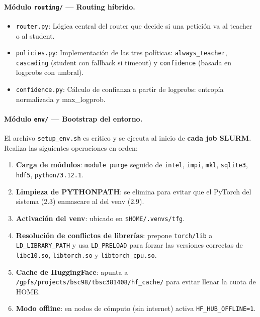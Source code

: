 \documentclass[11pt,a4paper]{article}
\begin{document}
\paragraph{M\'odulo \texttt{routing/} --- Routing h\'ibrido.}
\begin{itemize}[leftmargin=2em]
  \item \texttt{router.py}: L\'ogica central del router que decide
    si una petici\'on va al teacher o al student.
  \item \texttt{policies.py}: Implementaci\'on de las tres pol\'iticas:
    \texttt{always\_teacher}, \texttt{cascading} (student con fallback
    si timeout) y \texttt{confidence} (basada en logprobs con umbral).
  \item \texttt{confidence.py}: C\'alculo de confianza a partir de
    logprobs: entrop\'ia normalizada y max\_logprob.
\end{itemize}

\paragraph{M\'odulo \texttt{env/} --- Bootstrap del entorno.}
El archivo \texttt{setup\_env.sh} es cr\'itico y se ejecuta al inicio
de \textbf{cada job SLURM}. Realiza las siguientes operaciones en orden:

\begin{enumerate}
  \item \textbf{Carga de m\'odulos}: \texttt{module purge} seguido de
    \texttt{intel}, \texttt{impi}, \texttt{mkl}, \texttt{sqlite3},
    \texttt{hdf5}, \texttt{python/3.12.1}.
  \item \textbf{Limpieza de PYTHONPATH}: se elimina para evitar que el
    PyTorch del sistema (2.3) enmascare al del venv (2.9).
  \item \textbf{Activaci\'on del venv}: ubicado en
    \texttt{\$HOME/.venvs/tfg}.
  \item \textbf{Resoluci\'on de conflictos de librer\'ias}: prepone
    \texttt{torch/lib} a \texttt{LD\_LIBRARY\_PATH} y usa
    \texttt{LD\_PRELOAD} para forzar las versiones correctas de
    \texttt{libc10.so}, \texttt{libtorch.so} y
    \texttt{libtorch\_cpu.so}.
  \item \textbf{Cache de HuggingFace}: apunta a
    \texttt{/gpfs/projects/bsc98/tbsc381408/hf\_cache/} para evitar
    llenar la cuota de HOME.
  \item \textbf{Modo offline}: en nodos de c\'omputo (sin internet)
    activa \texttt{HF\_HUB\_OFFLINE=1}.
\end{enumerate}
\end{document}
